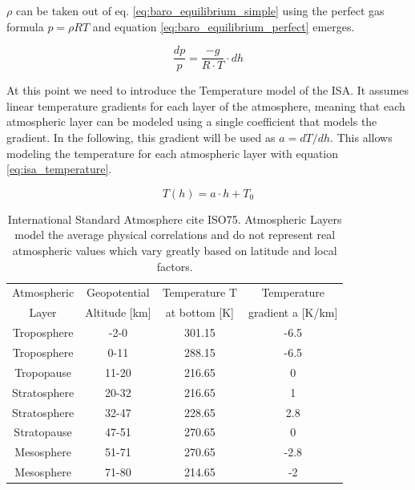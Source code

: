 $\rho$ can be taken out of eq. \ref{eq:baro_equilibrium_simple} using the perfect gas formula $p=\rho R T$ and equation \ref{eq:baro_equilibrium_perfect} emerges.

\begin{equation}
    \frac{dp}{p} = \frac{-g}{R \cdot T} \cdot dh
    \label{eq:baro_equilibrium_perfect}
\end{equation}


At this point we need to introduce the Temperature model of the ISA. It assumes linear temperature gradients for each layer of the atmosphere, meaning that each atmospheric layer can be modeled using a single coefficient that models the gradient. In the following, this gradient will be used as $a=dT/dh$. This allows modeling the temperature for each atmospheric layer with equation \ref{eq:isa_temperature}.

\begin{equation}
    T(h)= a  \cdot h + T_0
    \label{eq:isa_temperature}
\end{equation}

\begin{table}[h]
    \centering
    \begin{tabular}{@{}cccc@{}}
        \toprule
        Atmospheric  & Geopotential      & Temperature T     & Temperature           \\
        Layer        & Altitude {[}km{]} & at bottom {[}K{]} & gradient a {[}K/km{]} \\ \midrule
        Troposphere  & -2-0              & 301.15            & -6.5                  \\
        Troposphere  & 0-11              & 288.15            & -6.5                  \\
        Tropopause   & 11-20             & 216.65            & 0                     \\
        Stratosphere & 20-32             & 216.65            & 1                     \\
        Stratosphere & 32-47             & 228.65            & 2.8                   \\
        Stratopause  & 47-51             & 270.65            & 0                     \\
        Mesosphere   & 51-71             & 270.65            & -2.8                  \\
        Mesosphere   & 71-80             & 214.65            & -2                    \\ \bottomrule
    \end{tabular}
    \caption{International Standard Atmosphere cite ISO75. Atmospheric Layers model the average physical correlations and do not represent real atmospheric values which vary greatly based on latitude and local factors.}
    \label{tab:isa_temp}
\end{table}


